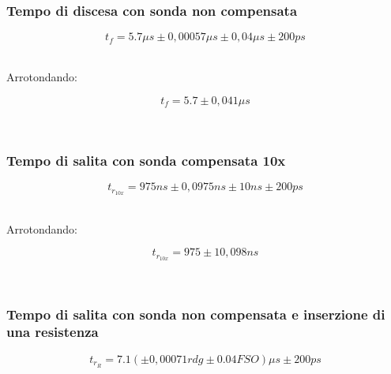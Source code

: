 \documentclass[a4paper]{article}
\begin{document}
\subsubsection{Tempo di discesa con sonda non compensata}
\begin{Large}
	\begin{equation}
  		{t_f}= 5.7\mu s \pm 0,00057\mu s \pm0,04\mu s \pm200ps
	\end{equation}
\end{Large}\\

Arrotondando: 

\begin{Large}
	\begin{equation}
  		{t_f}= 5.7\pm 0,041 \mu s
	\end{equation}
\end{Large}\\

\subsubsection{Tempo di salita con sonda compensata 10x}

\begin{Large}
	\begin{equation}
		{t_{r_{10x}}}= 975ns \pm 0,0975ns \pm10ns \pm200ps
	\end{equation}
\end{Large}\\

Arrotondando: 

\begin{Large}
	\begin{equation}
		{t_{r_{10x}}}= 975\pm 10,098 ns
	\end{equation}
\end{Large}\\

\subsubsection{Tempo di salita con sonda non compensata e inserzione di una resistenza}
\begin{Large}
	\begin{equation}
  		t_{r_R}= 7.1(\pm 0,00071 rdg \pm0.04 FSO)\mu s \pm200ps %
	\end{equation}
\end{Large}\\
\end{document}
